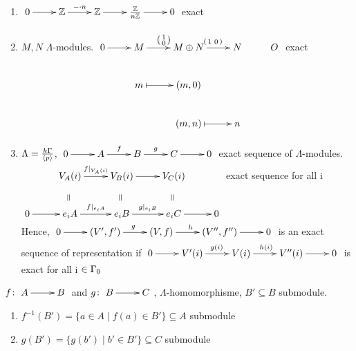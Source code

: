 \begin{exam}
	\begin{enumerate}[(1)]
		\item  $\xymatrix{0 \ar[r] & \mathbb{Z}\ar[r]^{-\cdot n} & \mathbb{Z}\ar[r] & \frac{\mathbb{Z}}{n\mathbb{Z}} \ar[r] & 0}$ exact
		\item $M, N$ $\Lambda$-modules.
		$\xymatrix
		{
			0\ar[r] & M\ar[r]^{\left(\begin{smallmatrix} 1 \\ 0 \end{smallmatrix}\right)} & M\oplus N\ar[r]^{\left(\begin{smallmatrix} 1 & 0 \end{smallmatrix}\right)} & N & O \\
			  & m \ar@{|->}[r]& (m,0) \\
			  &   & (m,n) \ar@{|->}[r]    & n\\
		}$ exact
	\item $\Lambda = \frac{k\Gamma}{\langle p \rangle}$, $\xymatrix{0 \ar[r] & A\ar[r]^f & B\ar[r]^g & C \ar[r] & 0}$ exact sequence of $\Lambda$-modules.
	$\xymatrix
	{
		 & V_A(i)\ar@{}[d]|-*[@]{=} \ar[r]^{f\vert_{V_A(i)}} & V_B(i)\ar@{}[d]|-*[@]{=} \ar[r]& V_C(i)\ar@{}[d]|-*[@]{=} & \\
		0\ar[r]& e_iA \ar[r]^{f\vert_{e_iA}}  & e_iB  \ar[r]^{g\vert_{e_iB}}  & e_iC \ar[r]  & 0\\
	}$ exact sequence for all i\\
Hence, 	$\xymatrix{0 \ar[r] & (V',f')\ar[r]^g & (V,f)\ar[r]^h & (V'',f'') \ar[r] & 0}$ is an exact sequence of representation if $\xymatrix{0 \ar[r] & V'(i)\ar[r]^{g(i)} & V(i)\ar[r]^{h(i)} & V''(i) \ar[r] & 0}$ is exact for all i $\in\Gamma_0$
	
	\end{enumerate}
\end{exam}

\begin{exer}
		$f\colon\xymatrix{A\ar[r] & B}$ and $g\colon\xymatrix{B\ar[r] & C}$, $\Lambda$-homomorphisme, $B' \subseteq B$ submodule.
		\begin{enumerate}[(1)]
			\item $f^{-1}(B')= \{ a\in A\mid f(a)\in B'\}\subseteq A$ submodule
			\item $g(B')= \{ g(b')\mid b'\in B'\}\subseteq C$ submodule
		\end{enumerate}
\end{exer}

